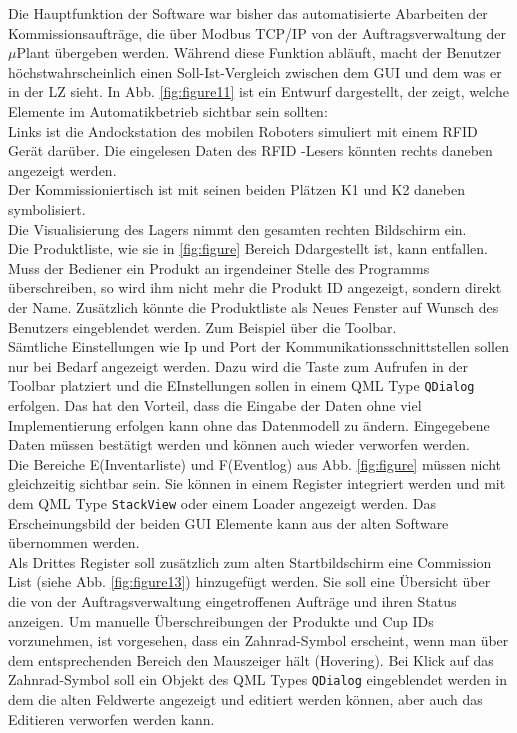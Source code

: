 Die Hauptfunktion der Software war bisher das automatisierte Abarbeiten der Kommissionsaufträge, die über Modbus TCP/IP
von der Auftragsverwaltung der $\mu$Plant übergeben werden.
Während diese Funktion abläuft, macht der Benutzer höchstwahrscheinlich einen Soll-Ist-Vergleich zwischen dem GUI
und dem was er in der LZ sieht.
In Abb. \ref{fig:figure11} ist ein Entwurf dargestellt, der zeigt, welche Elemente im Automatikbetrieb sichtbar sein sollten:\\
Links ist die Andockstation des mobilen Roboters simuliert mit einem RFID Gerät darüber.
Die eingelesen Daten des RFID -Lesers könnten rechts daneben angezeigt werden.\\
Der Kommissioniertisch ist mit seinen beiden Plätzen \glqq K1 \grqq und \glqq K2 \grqq  daneben symbolisiert.\\
Die Visualisierung des Lagers nimmt den gesamten rechten Bildschirm ein.\\
Die Produktliste, wie sie in \ref{fig:figure} Bereich \glqq D\grqq dargestellt ist, kann entfallen.
Muss der Bediener ein Produkt an irgendeiner Stelle des Programms überschreiben, so wird ihm nicht mehr die Produkt ID
angezeigt, sondern direkt der Name.
Zusätzlich könnte die Produktliste als Neues Fenster auf Wunsch des Benutzers eingeblendet werden.
Zum Beispiel über die Toolbar.\\
Sämtliche Einstellungen wie Ip und Port der Kommunikationsschnittstellen sollen nur bei Bedarf angezeigt werden.
Dazu wird die Taste zum Aufrufen in der Toolbar platziert und die EInstellungen sollen in einem QML Type \verb|QDialog|
erfolgen.
Das hat den Vorteil, dass die Eingabe der Daten ohne viel Implementierung erfolgen kann ohne das Datenmodell zu ändern.
Eingegebene Daten müssen bestätigt werden und können auch wieder verworfen werden.\\
Die Bereiche \glqq E\grqq (Inventarliste) und \glqq F\grqq (Eventlog) aus Abb. \ref{fig:figure} müssen nicht
gleichzeitig sichtbar sein.
Sie können in einem Register integriert werden und mit dem QML Type \verb|StackView| oder einem Loader angezeigt werden.
Das Erscheinungsbild der beiden GUI Elemente kann aus der alten Software übernommen werden.\\
Als Drittes Register soll zusätzlich zum alten Startbildschirm eine Commission List (siehe Abb. \ref{fig:figure13}) hinzugefügt werden.
Sie soll eine Übersicht über die von der Auftragsverwaltung eingetroffenen Aufträge und ihren Status anzeigen.
Um manuelle Überschreibungen der Produkte und Cup IDs vorzunehmen, ist vorgesehen, dass ein Zahnrad-Symbol erscheint,
wenn man über dem entsprechenden Bereich den Mauszeiger hält (Hovering).
Bei Klick auf das Zahnrad-Symbol soll ein Objekt des QML Types \verb|QDialog| eingeblendet werden in dem die alten
Feldwerte angezeigt und editiert werden können, aber auch das Editieren verworfen werden kann.\\
\vspace{1cm}

